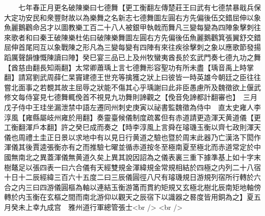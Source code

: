 　　七年春正月更名破陳樂曰七德舞【更工衡翻左傳楚莊王曰武有七德禁暴戢兵保大定功安民和衆豐財故以為樂舞之名新志七德舞圖左圓右方先偏後伍交錯屈伸以象魚麗鵝鸛命呂才以圖教樂工百二十八人被銀甲執戟而舞凡三變每變為四陣象擊刺往來歌者和曰秦王破陳樂杜佑曰破陳樂舞圖左圓右方先偏後伍魚麗鵝鸛箕張翼舒交錯屈伸首尾囘互以象戰陳之形凡為三變每變有四陣有來往疾徐擊刺之象以應歌節發揚蹈厲聲韻慷慨陳讀曰陣】癸巳宴三品已上及州牧蠻夷酋長於玄武門奏七德九功之舞【酋慈由翻長知兩翻】太常卿蕭瑀上言七德舞形容聖功有所未盡【瑀音禹上時掌翻】請寫劉武周薛仁杲竇建德王世充等擒獲之狀上曰彼皆一時英雄今朝廷之臣往往嘗北面事之若覩其故主屈辱之狀能不傷其心乎瑀謝曰此非臣愚慮所及魏徵欲上偃武修文每侍宴見七德舞輒俛首不視見九功舞則諦觀之【俛音免諦都計翻審也】　三月戊子侍中王珪坐漏泄禁中語左遷同州刺史庚寅以祕書監魏徵為侍中　直太史雍人李淳風【雍縣屬岐州雍於用翻】奏靈臺候儀制度疏畧但有赤道請更造渾天黄道儀【更工衡翻渾戶本翻】許之癸巳成而奏之【時李淳風上言舜在璿璣玉衡以齊七政則渾天儀也周禮土圭正日景以求地中有以見日行黄道之驗也暨於周末此器乃亡漢洛下閎作渾儀其後賈逵張衡亦有之而推驗七曜並循赤道按冬至極南夏至極北而赤道常定於中國無南北之異蓋渾儀無黄道久矣上異其說因詔為之儀表裏三重下據準基上如十字末樹鼇足以張四表一曰六合儀有天經雙規金渾緯規金常規相結於四極之内列二十八宿十日十二辰經緯三百六十五度二曰三辰儀圓徑八尺有璿璣規日游規列宿所行轉於六合之内三曰四游儀圓樞為軸以連結玉衡游筩而貫約矩規又玄極北樹北辰南矩地軸傍轉於内玉衡在玄樞之間而南北游仰以觀天之辰宿下以識器之晷度皆用銅為之】夏五月癸未上幸九成宫　雅州道行軍總管張士<br />
<br />
